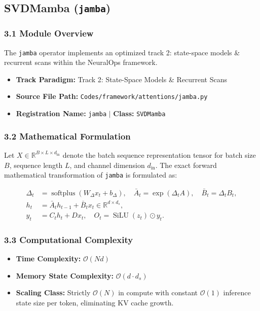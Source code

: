 \subsection{SVDMamba (\texttt{jamba})}
\label{sec:app_module_jamba}

\subsubsection*{3.1 Module Overview}
The \texttt{jamba} operator implements an optimized track 2: state-space models \& recurrent scans within the NeuralOps framework.
\begin{itemize}
    \item \textbf{Track Paradigm:} Track 2: State-Space Models \& Recurrent Scans
    \item \textbf{Source File Path:} \texttt{Codes/framework/attentions/jamba.py}
    \item \textbf{Registration Name:} \texttt{jamba} $\mid$ \textbf{Class:} \texttt{SVDMamba}
\end{itemize}

\subsubsection*{3.2 Mathematical Formulation}
Let $X \in \mathbb{R}^{B \times L \times d_{\text{in}}}$ denote the batch sequence representation tensor for batch size $B$, sequence length $L$, and channel dimension $d_{\text{in}}$. The exact forward mathematical transformation of \texttt{jamba} is formulated as:

\begin{align}
\Delta_t &= \operatorname{softplus}(W_\Delta x_t + b_\Delta), \quad \bar{A}_t = \exp(\Delta_t A), \quad \bar{B}_t = \Delta_t B_t, \\
h_t &= \bar{A}_t h_{t-1} + \bar{B}_t x_t \in \mathbb{R}^{d \times d_s}, \\
y_t &= C_t h_t + D x_t, \quad O_t = \operatorname{SiLU}(z_t) \odot y_t.
\end{align}


\subsubsection*{3.3 Computational Complexity}
\begin{itemize}
    \item \textbf{Time Complexity:} $\mathcal{O}(N d)$
    \item \textbf{Memory State Complexity:} $\mathcal{O}(d \cdot d_s)$
    \item \textbf{Scaling Class:} Strictly $\mathcal{O}(N)$ in compute with constant $\mathcal{O}(1)$ inference state size per token, eliminating KV cache growth.
\end{itemize}

